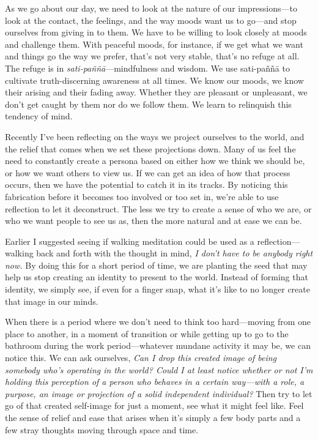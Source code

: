 As we go about our day, we need to look at the nature of our 
impressions---to look at the contact, the feelings, and the way moods 
want us to go---and stop ourselves from giving in to them. We have to 
be willing to look closely at moods and challenge them. With peaceful 
moods, for instance, if we get what we want and things go the way we 
prefer, that's not very stable, that's no refuge at all. The refuge is 
in \emph{sati-paññā}---mindfulness and wisdom. We use sati-paññā 
to cultivate truth-discerning awareness at all times. We know our 
moods, we know their arising and their fading away. Whether they are 
pleasant or unpleasant, we don't get caught by them nor do we follow 
them. We learn to relinquish this tendency of mind.


Recently I've been reflecting on the ways we project ourselves to the 
world, and the relief that comes when we set these projections down. 
Many of us feel the need to constantly create a persona based on either 
how we think we should be, or how we want others to view us. If we can 
get an idea of how that process occurs, then we have the potential to 
catch it in its tracks. By noticing this fabrication before it becomes 
too involved or too set in, we're able to use reflection to let it 
deconstruct. The less we try to create a sense of who we are, or who we 
want people to see us as, then the more natural and at ease we can be.

Earlier I suggested seeing if walking meditation could be used as a 
reflection---walking back and forth with the thought in mind, \emph{I 
don't have to be anybody right now.} By doing this for a short period 
of time, we are planting the seed that may help us stop creating an 
identity to present to the world. Instead of forming that identity, we 
simply see, if even for a finger snap, what it's like to no longer 
create that image in our minds.

When there is a period where we don't need to think too hard---moving 
from one place to another, in a moment of transition or while getting 
up to go to the bathroom during the work period---whatever mundane 
activity it may be, we can notice this. We can ask ourselves, \emph{Can 
I drop this created image of being somebody who's operating in the 
world? Could I at least notice whether or not I'm holding this 
perception of a person who behaves in a certain way---with a role, a 
purpose, an image or projection of a solid independent individual?} 
Then try to let go of that created self-image for just a moment, see 
what it might feel like. Feel the sense of relief and ease that arises 
when it's simply a few body parts and a few stray thoughts moving 
through space and time.

